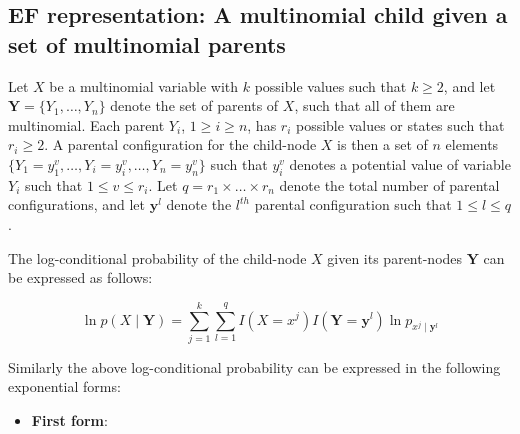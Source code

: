 \documentclass[11pt, oneside]{article}   	%
\numberwithin{figure}{section}
\numberwithin{equation}{section}
\numberwithin{table}{section}
\theoremstyle{definition}
\begin{document}
\begin{appendices}
\section{EF representation: A multinomial child given a set of multinomial parents}

Let $X$ be a multinomial variable with $k$ possible values such that $k \geq 2$, and let $\mathbf{Y} =\{Y_1,\ldots,Y_n\}$ denote the set of parents of $X$, such that all of them are multinomial. Each parent $Y_i$, $1 \geq i \geq n$, has $r_i$ possible values or states such that $r_i \geq 2$. A parental configuration for the child-node $X$ is then a set of $n$ elements $\{Y_1 = y_1^{v}, \ldots, Y_i = y_i^{v},\ldots, Y_n = y_n^{v} \}$ such that $y_i^{v}$ denotes a potential value of variable $Y_i$ such that  $1 \leq v \leq r_i$. Let $q = r_1 \times \ldots \times r_n$ denote the total number of parental configurations, and let $\mathbf{y}^l$ denote the $l^{th}$ parental configuration such that $1 \leq l \leq q$.

The log-conditional probability of the child-node $X$ given its parent-nodes $\mathbf{Y}$ can be expressed as follows:

$$ \ln p(X \mid \mathbf{Y}) = \sum_{j=1}^k \sum_{l=1}^q I(X=x^j) I(\mathbf{Y} =\mathbf{y}^l) \ln p_{x^j  \mid \mathbf{y}^l} $$

Similarly the above log-conditional probability can be expressed in the following exponential forms:

\begin{itemize}

\item \textbf{First form}:


\end{itemize}
\end{appendices}
\end{document}
